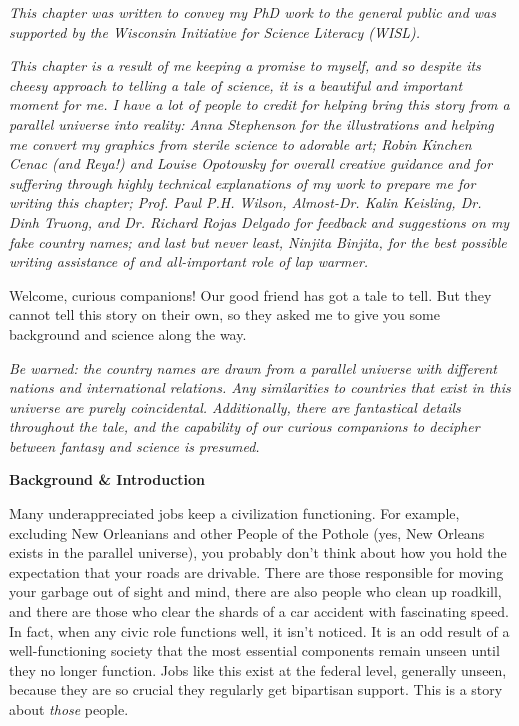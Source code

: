 {
\setlength{\parindent}{0pt}
\setlength{\parskip}{1em}

\begin{quoting}
  {
  \footnotesize
  \textit{This chapter was written to convey my PhD work to the general public
  and was supported by the Wisconsin Initiative for Science Literacy (WISL).}
  
  \textit{This chapter is a result of me keeping a promise to myself, and so
  despite its cheesy approach to telling a tale of science, it is a beautiful
  and important moment for me. I have a lot of people to credit for helping
  bring this story from a parallel universe into reality: Anna Stephenson for
  the illustrations and helping me convert my graphics from sterile science to
  adorable art; Robin Kinchen Cenac (and Reya!) and Louise Opotowsky for
  overall creative guidance and for suffering through highly technical
  explanations of my work to prepare me for writing this chapter; Prof. Paul
  P.H. Wilson, Almost-Dr.  Kalin Keisling, Dr. Dinh Truong, and Dr. Richard
  Rojas Delgado for feedback and suggestions on my fake country names; and last
  but never least, Ninjita Binjita, for the best possible writing assistance of
  and all-important role of lap warmer.}  
  }
\end{quoting}

\narr Welcome, curious companions! Our good friend has got a tale to tell.  But
they cannot tell this story on their own, so they asked me to give you some
background and science along the way.

\textit{Be warned: the country names are drawn from a parallel universe with
different nations and international relations. Any similarities to countries
that exist in this universe are purely coincidental. Additionally, there are
fantastical details throughout the tale, and the capability of our curious
companions to decipher between fantasy and science is presumed.}

\begin{tcolorbox}[halign=center]
\textbf{Background \& Introduction}
\end{tcolorbox}

Many underappreciated jobs keep a civilization functioning. For example,
excluding New Orleanians and other People of the Pothole (yes, New Orleans
exists in the parallel universe), you probably don't think about how you hold
the expectation that your roads are drivable. There are those responsible for
moving your garbage out of sight and mind, there are also people who clean up
roadkill, and there are those who clear the shards of a car accident with
fascinating speed. In fact, when any civic role functions well, it isn't
noticed. It is an odd result of a well-functioning society that the most
essential components remain unseen until they no longer function. Jobs like
this exist at the federal level, generally unseen, because they are so crucial
they regularly get bipartisan support. This is a story about \textit{those}
people.

}
